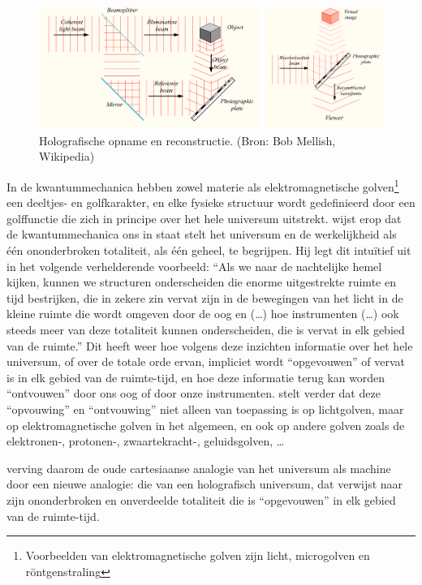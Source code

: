 \documentclass[
  11pt,
]{book}
\begin{document}
\begin{figure}

{\centering \includegraphics[width=1\linewidth]{./figs/holographySmall} 

}

\caption{Holografische opname en reconstructie. (Bron: Bob Mellish, Wikipedia)}\label{fig:hologram1}
\end{figure}

In de kwantummechanica hebben zowel materie als elektromagnetische golven\footnote{Voorbeelden van elektromagnetische golven zijn licht, microgolven en röntgenstraling} een deeltjes- en golfkarakter, en elke fysieke structuur wordt gedefinieerd door een golffunctie die zich in principe over het hele universum uitstrekt. \citet{bohm1980} wijst erop dat de kwantummechanica ons in staat stelt het universum en de werkelijkheid als één ononderbroken totaliteit, als één geheel, te begrijpen. Hij legt dit intuïtief uit in het volgende verhelderende voorbeeld: ``Als we naar de nachtelijke hemel kijken, kunnen we structuren onderscheiden die enorme uitgestrekte ruimte en tijd bestrijken, die in zekere zin vervat zijn in de bewegingen van het licht in de kleine ruimte die wordt omgeven door de oog en (\ldots) hoe instrumenten (\ldots) ook steeds meer van deze totaliteit kunnen onderscheiden, die is vervat in elk gebied van de ruimte.'' Dit heeft weer hoe volgens deze inzichten informatie over het hele universum, of over de totale orde ervan, impliciet wordt ``opgevouwen'' of vervat is in elk gebied van de ruimte-tijd, en hoe deze informatie terug kan worden ``ontvouwen'' door ons oog of door onze instrumenten. \citet{bohm1980} stelt verder dat deze ``opvouwing'' en ``ontvouwing'' niet alleen van toepassing is op lichtgolven, maar op elektromagnetische golven in het algemeen, en ook op andere golven zoals de elektronen-, protonen-, zwaartekracht-, geluidsgolven, \ldots{}

\citet{bohm1980} verving daarom de oude cartesiaanse analogie van het universum als machine door een nieuwe analogie: die van een holografisch universum, dat verwijst naar zijn ononderbroken en onverdeelde totaliteit die is ``opgevouwen'' in elk gebied van de ruimte-tijd.
\end{document}

